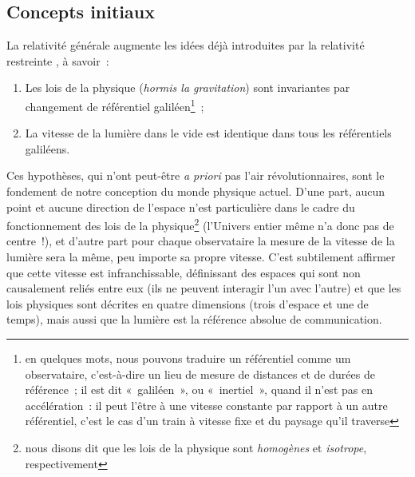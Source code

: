 \documentclass[../main/main.tex]{subfiles}
\begin{document}
\subsection{Concepts initiaux}\label{ssec:RG}

La relativité générale augmente les idées déjà introduites par la relativité
restreinte \citep[voir][et les autres articles de l'\textit{annus
mirabilis}\footnote{c'est ainsi que nous nommons l'année 1905 pendant laquelle
    \textsc{Einstein} publie quatre articles considérés comme étant à l'origine
de la physique moderne}]{einstein1905}, à savoir~:
\begin{enumerate}
    \item Les lois de la physique (\textit{hormis la gravitation}) sont
        invariantes par changement de référentiel galiléen\footnote{en quelques
            mots, nous pouvons traduire un référentiel comme um observataire,
            c'est-à-dire un lieu de mesure de distances et de durées de
            référence~; il est dit «~galiléen~», ou «~inertiel~», quand il n'est
            pas en accélération~: il peut l'être à une vitesse constante par
            rapport à un autre référentiel, c'est le cas d'un train à vitesse
        fixe et du paysage qu'il traverse}~;
    \item La vitesse de la lumière dans le vide est identique dans tous les
        référentiels galiléens.
\end{enumerate}

Ces hypothèses, qui n'ont peut-être \textit{a priori} pas l'air
révolutionnaires, sont le fondement de notre conception du monde physique
actuel. D'une part, aucun point et aucune direction de l'espace n'est
particulière dans le cadre du fonctionnement des lois de la
physique\footnote{nous disons dit que les lois de la physique sont
\textit{homogènes} et \textit{isotrope}, respectivement} (l'Univers entier même
n'a donc pas de centre~!), et d'autre part pour chaque observataire la mesure de
la vitesse de la lumière sera la même, peu importe sa propre vitesse. C'est
subtilement affirmer que cette vitesse est infranchissable, définissant des
espaces qui sont non causalement reliés entre eux (ils ne peuvent interagir l'un
avec l'autre) et que les lois physiques sont décrites en quatre dimensions
(trois d'espace et une de temps), mais aussi que la lumière est la référence
absolue de communication.
\end{document}
